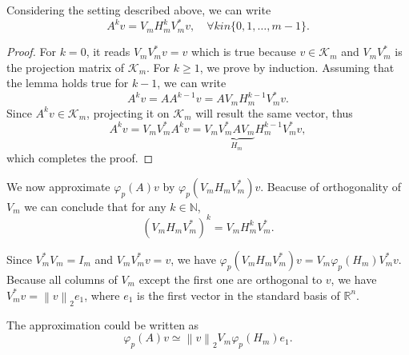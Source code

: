 \begin{lemma}
    \label{lm:krylovsubspacepowered}
    Considering the setting described above, we can write
    \begin{equation}
        A^k v = V_m H_m^k V_m^* v, \quad \forall k in \{0, 1, \dots, m-1 \}.
    \end{equation}
\end{lemma}

\begin{proof}
    For $k=0$, it reads $V_m V_m^* v = v$ which is true because $v \in \mathcal{K}_m$ and $V_m V_m^*$
    is the projection matrix of $\mathcal{K}_m$. For $k \ge 1$, we prove by induction. Assuming that
    the lemma holds true for $k-1$, we can write
    \begin{equation*}
        A^{k} v = A A^{k-1} v = A V_m H_m^{k-1} V_m^* v.
    \end{equation*}
    Since $A^{k} v \in \mathcal{K}_m$, projecting it on $\mathcal{K}_m$ will result the same vector,
    thus
    \begin{equation*}
        A^{k} v = V_m V_m^* A^{k} v = V_m \underset{H_m}{\underbrace{V_m^* A V_m}} H_m^{k-1} V_m^* v,
    \end{equation*}
    which completes the proof.
\end{proof}

We now approximate $\varphi_p(A)v$ by $\varphi_p(V_m H_m V_m^*)v$. Beacuse of orthogonality of $V_m$
we can conclude that for any $k \in \mathbb{N}$,
\begin{equation}
    \label{eq:reprojectionpower}
    (V_m H_m V_m^*)^{k} = V_m H_m^k V_m^*.
\end{equation}

Since $V_m^* V_m = I_m$ and $V_m V_m^* v = v$, we have $\varphi_p(V_m H_m V_m^*)v = V_m \varphi_p(H_m) V_m^* v$.
Because all columns of $V_m$ except the first one are orthogonal to $v$, we have $V_m^* v = \left\| v \right\|_{2} e_1$,
where $e_1$ is the first vector in the standard basis of $\mathbb{R}^n$.

The approximation could be written as
\begin{equation}
    \varphi_p(A)v \simeq \left\| v \right\|_{2} V_m \varphi_p(H_m) e_1.
\end{equation}

